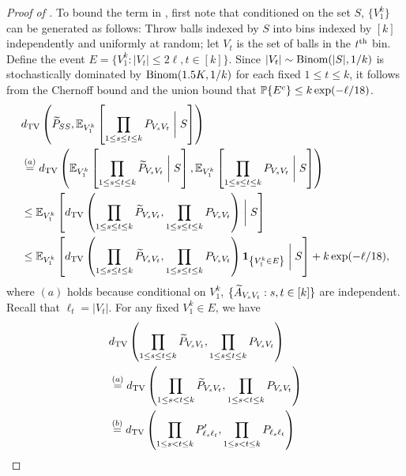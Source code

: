 \begin{proof}[Proof of ]
To bound the term in , first note that conditioned on the set $S$, $\{V_1^k\}$ can be generated as follows: Throw balls indexed by $S$ into bins indexed by $[k]$ independently and uniformly at random; let $V_t$ is the set of balls in the $t^{\rm th}$ bin. Define the event $E = \{V_1^k: |V_t| \leq 2 \ell, t \in[k]\}$. Since $|V_t| \sim {\rm Binom}(|S|,1/k)$ is stochastically dominated by ${\rm Binom}(1.5K,1/k)$ for each fixed $ 1 \le t\le k$, it follows from the Chernoff bound and the union bound that $\mathbb{P}\{E^c\} \le k \exp(-\ell/18)$.
\begin{align*}
& d_{\rm TV} \left(  {\widetilde{P}}_{SS},  \mathbb{E}_{V_1^k} \left [  \prod_{1 \le s \le t \le k} P_{V_sV_t} \biggm \vert S \right]\right) \nonumber\\
&\overset{(a)}{=} d_{\rm TV} \left(  \mathbb{E}_{V_1^k} \left [  \prod_{1 \le s \le t \le k} \widetilde{P}_{V_s V_t}  \biggm \vert S\right],  \mathbb{E}_{V_1^k} \left [  \prod_{1 \le s \le t \le k} P_{V_sV_t} \biggm \vert S \right]\right) \nonumber \\
& \le \mathbb{E}_{V_1^k } \left [ d_{\rm TV} \left(  \prod_{1 \le s \le t \le k} \widetilde{P}_{V_sV_t},   \prod_{1 \le s \le t \le k} P_{V_sV_t} \right) \biggm \vert S \right] \nonumber\\
& \le \mathbb{E}_{V_1^k } \left [ d_{\rm TV} \left( \prod_{1 \le s \le t \le k} \widetilde{P}_{V_sV_t},   \prod_{1 \le s \le t \le k} P_{V_sV_t} \right)  {\mathbf{1}_{\left\{{V_1^k \in E}\right\}}}\biggm \vert S \right] +k \exp(-\ell/18),
\end{align*}
where $(a)$ holds because conditional on $V_1^k$, $\{ {\widetilde{A}}_{V_s V_t} : s, t \in [k] \}$ are independent.  Recall that $\ell_t=|V_t|$. For any fixed $V_1^k \in E$, we have
\begin{align*}
 & d_{\rm TV} \left( \prod_{1 \le s \le t \le k} \widetilde{P}_{V_sV_t},   \prod_{1 \le s \le t \le k} P_{V_sV_t} \right) \\
 &\overset{(a)}{=} d_{\rm TV} \left( \prod_{1\leq s<t \leq k} \widetilde{P}_{V_sV_t},   \prod_{1\leq s<t \leq k} P_{V_sV_t} \right)  \nonumber  \\
 &\overset{(b)}{=} d_{\rm TV} \left( \prod_{1\leq s<t \leq k} P'_{\ell_s \ell_t},  \prod_{1\leq s<t \leq k} P_{\ell_s \ell_t} \right) \nonumber  \\

\end{align*}
\end{proof}
